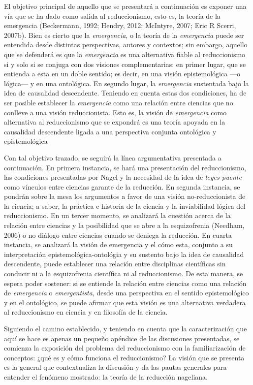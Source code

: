 \documentclass[]{book}
\begin{document}
El objetivo principal de aquello que se presentará a continuación es
exponer una vía que se ha dado como salida al reduccionismo, esto es, la
teoría de la emergencia (Beckermann, 1992; Hendry, 2012; McIntyre, 2007;
Eric R Scerri, 2007b). Bien es cierto que la \emph{emergencia}, o la
teoría de la \emph{emergencia} puede ser entendida desde distintas
perspectivas, autores y contextos; sin embargo, aquello que se defenderá
es que la \emph{emergencia} es una alternativa fiable al reduccionismo
si y solo si se conjuga con dos visiones complementarias: en primer
lugar, que se entienda a esta en un doble sentido; es decir, en una
visión epistemológica ---o lógica--- y en una ontológica. En segundo
lugar, la \emph{emergencia} sustentada bajo la idea de causalidad
descendente. Teniendo en cuenta estas dos condiciones, ha de ser posible
establecer la \emph{emergencia} como una relación entre ciencias que no
conlleve a una visión reduccionista. Esto es, la visión de
\emph{emergencia} como alternativa al reduccionismo que se expondrá es
una teoría apoyada en la causalidad descendente ligada a una perspectiva
conjunta ontológica y epistemológica

Con tal objetivo trazado, se seguirá la línea argumentativa presentada a
continuación. En primera instancia, se hará una presentación del
reduccionismo, las condiciones presentadas por Nagel y la necesidad de
la idea de \emph{leyes-puente} como vínculos entre ciencias garante de
la reducción. En segunda instancia, se pondrán sobre la mesa los
argumentos a favor de una visión no-reduccionista de la ciencia; a
saber, la práctica e historia de la ciencia y la inviabilidad lógica del
reduccionismo. En un tercer momento, se analizará la cuestión acerca de
la relación entre ciencias y la posibilidad que se abre a la
esquizofrenia (Needham, 2006) o no diálogo entre ciencias cuando se
deniega la reducción. En cuarta instancia, se analizará la visión de
emergencia y el cómo esta, conjunto a su interpretación
epistemológica-ontológia y su sustento bajo la idea de causalidad
descendente, puede establecer una relación entre disciplinas científicas
sin conducir ni a la esquizofrenia científica ni al reduccionismo. De
esta manera, se espera poder sostener: si se entiende la relación entre
ciencias como una relación de \emph{emergencia} o \emph{emergentista},
desde una perspectiva en el sentido epistemológico y en el ontológico,
se puede afirmar que esta visión es una alternativa verdadera al
reduccionismo en ciencia y en filosofía de la ciencia.

Siguiendo el camino establecido, y teniendo en cuenta que la
caracterización que aquí se hace es apenas un pequeño apéndice de las
discusiones presentadas, se comienza la exposición del problema del
reduccionismo con la familiarización de conceptos: ¿qué es y cómo
funciona el reduccionismo? La visión que se presenta es la general que
contextualiza la discusión y da las pautas generales para entender el
fenómeno mostrado: la teoría de la reducción nageliana.
\end{document}
